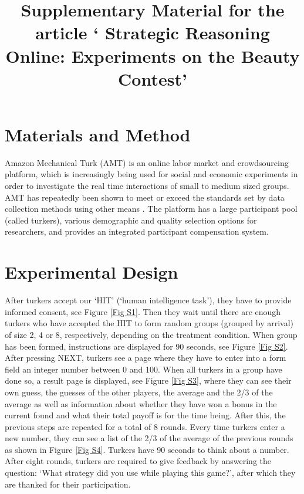 \title{Supplementary Material for the article ` Strategic Reasoning Online: Experiments on the Beauty Contest'}

\section{Materials and Method}
Amazon Mechanical Turk (AMT) is an online labor market and crowdsourcing platform, which is increasingly being used for social and economic experiments in order to investigate the real time interactions of small to medium sized groups. AMT has repeatedly been shown to meet or exceed the standards set by data collection methods using other means \citep{berinsky_huber_lenz_2012, BuhrmesterEtAl18}. The platform has a large participant pool (called turkers), various demographic and quality selection options for researchers, and provides an integrated participant compensation system.

\section{Experimental Design}
After turkers accept our ‘HIT’ (‘human intelligence task’), they have to provide informed consent, see Figure \ref{Fig S1}. Then they wait until there are enough turkers who have accepted the HIT to form random groups (grouped by arrival) of size 2, 4 or 8, respectively, depending on the treatment condition. 
When group has been formed, instructions are displayed for 90 seconds, see Figure \ref{Fig S2}. After pressing NEXT, turkers see a page where they have to enter into a form field an integer number between 0 and 100. When all turkers in a group have done so, a result page is displayed, see Figure \ref{Fig S3}, where they can see their own guess, the guesses of the other players, the average and the 2/3 of the average as well as information about whether they have won a bonus in the current found and what their total payoff is for the time being. 
After this, the previous steps are repeated for a total of 8 rounds. Every time turkers enter a new number, they can see a list of the 2/3 of the average of the previous rounds as shown in Figure \ref{Fig S4}. Turkers have 90 seconds to think about a number. After eight rounds, turkers are required to give feedback by answering the question: ‘What strategy did you use while playing this game?’, after which they are thanked for their participation.

